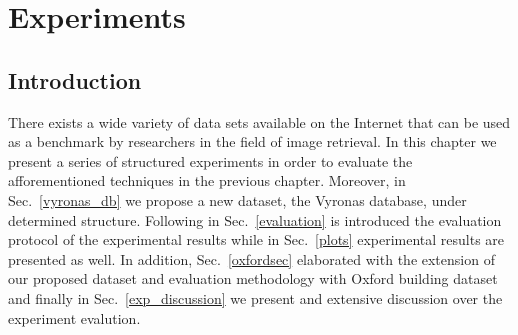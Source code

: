 \chapter{Experiments}\label{experiments}

\section{Introduction}

There exists a wide variety of data sets available on the Internet that can be used as a
benchmark by researchers in the field of image retrieval. In this chapter we present a series of structured experiments in order to evaluate the afforementioned techniques in the previous chapter. Moreover, in Sec.~\ref{vyronas_db} we propose a new dataset, the Vyronas database, under determined structure. Following in Sec.~\ref{evaluation} is introduced the evaluation protocol of the experimental results while in Sec.~\ref{plots} experimental results are presented as well.
In addition, Sec.~\ref{oxfordsec} elaborated with the extension of our proposed dataset and evaluation methodology with Oxford building dataset and finally in Sec.~\ref{exp_discussion} we present and extensive discussion over the experiment evalution.


